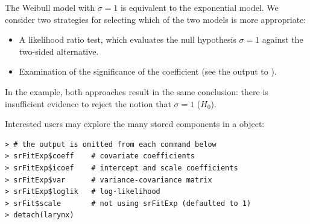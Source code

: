 \documentclass[article]{jss}
\begin{document}
The Weibull model with $\sigma=1$ is equivalent to the exponential model. We consider two strategies for selecting which of the two models is more appropriate:
\begin{itemize}
\item A likelihood ratio test, which evaluates the null hypothesis $\sigma=1$ against the two-sided alternative.
\item Examination of the significance of the  coefficient (see the output to ).
\end{itemize}
In the example, both approaches result in the same conclusion: there is insufficient evidence to reject the notion that $\sigma=1$ ($H_0$).

Interested users may explore the many stored components in a  object:
\begin{verbatim}
> # the output is omitted from each command below
> srFitExp$coeff    # covariate coefficients
> srFitExp$icoef    # intercept and scale coefficients
> srFitExp$var      # variance-covariance matrix
> srFitExp$loglik   # log-likelihood
> srFit$scale       # not using srFitExp (defaulted to 1)
> detach(larynx)
\end{verbatim}



\end{document}
